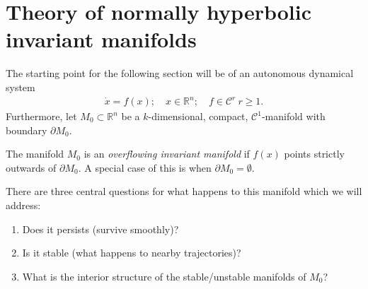 \newpage
\section{Theory of normally hyperbolic invariant manifolds}
The starting point for the following section will be of an autonomous dynamical system
\begin{align}
	\dot{x}=f(x);\quad x \in \mathbb{R}^{n};\quad f\in\mathcal{C}^{r}\ r\geq 1.
\end{align}
Furthermore, let $M_0\subset \mathbb{R}^{n}$ be a $k$-dimensional, compact, $\mathcal{C}^{1}$-manifold with boundary $\partial M_{0}$.

\begin{definition}
	The manifold $M_0$ is an \emph{overflowing invariant manifold} if $f(x)$ points strictly outwards of $\partial M_0$. A special case of this is when $\partial M_0= \emptyset$.
\end{definition}

There are three central questions for what happens to this manifold which we will address:
\begin{enumerate}
	\item Does it persists (survive smoothly)?
	\item Is it stable (what happens to nearby trajectories)?
	\item What is the interior structure of the stable/unstable manifolds of $M_0$?
\end{enumerate}


